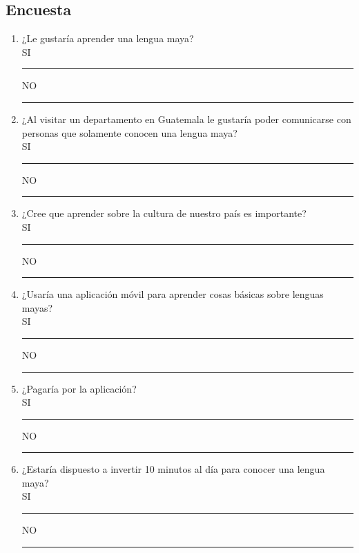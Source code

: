 \documentclass[a4paper,openright,11pt]{article}
\begin{document}
\subsection{Encuesta}
\begin{enumerate}
	\item ¿Le gustaría aprender una lengua maya?\\
	SI \rule{10mm}{0.1mm}  \hspace{5cm} NO \rule{10mm}{0.1mm}
	\item ¿Al visitar un departamento en Guatemala le gustaría poder comunicarse con personas que solamente conocen una lengua maya?	\\
	SI \rule{10mm}{0.1mm}  \hspace{5cm} NO \rule{10mm}{0.1mm}
	\item ¿Cree que aprender sobre la cultura de nuestro país es importante?\\
	SI \rule{10mm}{0.1mm}  \hspace{5cm} NO \rule{10mm}{0.1mm}
	\item ¿Usaría una aplicación móvil para aprender cosas básicas sobre lenguas mayas?\\
	SI \rule{10mm}{0.1mm}  \hspace{5cm} NO \rule{10mm}{0.1mm}
	\item ¿Pagaría por la aplicación?\\
	SI \rule{10mm}{0.1mm}  \hspace{5cm} NO \rule{10mm}{0.1mm}
	\item ¿Estaría dispuesto a invertir 10 minutos al día para conocer una lengua maya?\\
	SI \rule{10mm}{0.1mm}  \hspace{5cm} NO \rule{10mm}{0.1mm}
\end{enumerate}
\newpage
\end{document}
